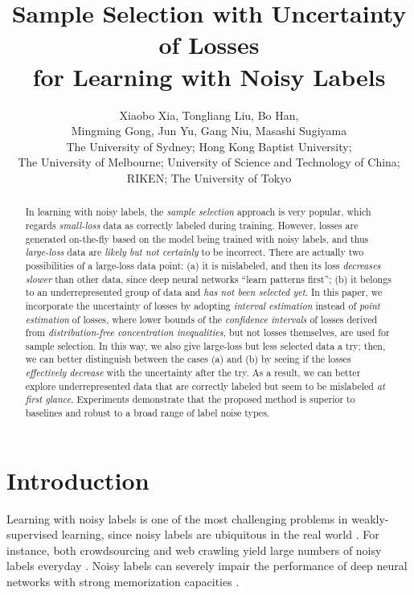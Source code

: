 \documentclass[11pt]{article}
\title{Sample Selection with Uncertainty of Losses\\
    for Learning with Noisy Labels}
\author{
  Xiaobo Xia,
  Tongliang Liu,
  Bo Han,\\
  Mingming Gong,
  Jun Yu,
  Gang Niu,
  Masashi Sugiyama\\
  \small{The University of Sydney;}
  \small{Hong Kong Baptist University;}\\
  \small{The University of Melbourne;}
  \small{University of Science and Technology of China;}\\
  \small{RIKEN;}
  \small{The University of Tokyo}
}
\date{}
\begin{document}
\maketitle

\begin{abstract}
In learning with noisy labels, the \emph{sample selection} approach is very popular, which regards \emph{small-loss} data as correctly labeled during training. However, losses are generated on-the-fly based on the model being trained with noisy labels, and thus \emph{large-loss} data are \emph{likely but not certainly} to be incorrect. There are actually two possibilities of a large-loss data point: (a) it is mislabeled, and then its loss \emph{decreases slower} than other data, since deep neural networks ``learn patterns first''; (b) it belongs to an underrepresented group of data and \emph{has not been selected yet}.
In this paper, we incorporate the uncertainty of losses by adopting \emph{interval estimation} instead of \emph{point estimation} of losses, where lower bounds of the \emph{confidence intervals} of losses derived from \emph{distribution-free concentration inequalities}, but not losses themselves, are used for sample selection. In this way, we also give large-loss but less selected data a try; then, we can better distinguish between the cases (a) and (b) by seeing if the losses \emph{effectively decrease} with the uncertainty after the try. As a result, we can better explore underrepresented data that are correctly labeled but seem to be mislabeled \emph{at first glance}. Experiments demonstrate that the proposed method is superior to baselines and robust to a broad range of label noise types.

\end{abstract}

\newpage


\section{Introduction}
Learning with noisy labels is one of the most challenging problems in weakly-supervised learning, since noisy labels are ubiquitous in the real world \citep{mirzasoleiman2020coresets,yu2019does,nishi2021augmentation,arazo2019unsupervised,yang2021free}. For instance, both crowdsourcing and web crawling yield large numbers of noisy labels everyday \citep{han2018co}. Noisy labels can severely impair the performance of deep neural networks with strong memorization capacities \citep{zhang2017understanding,zhang2018generalized,pleiss2020identifying,lukasik2020does}. 
\end{document}
